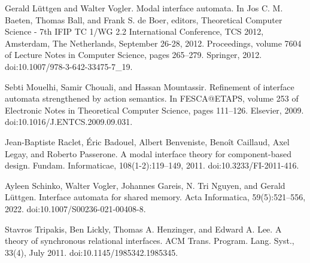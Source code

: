 \documentclass[10pt,a4paper]{article}
\begin{document}
\par\noindent  [21]  Gerald Lüttgen and Walter Vogler.  Modal interface automata.  In Jos C. M. Baeten, Thomas Ball, and Frank S. de Boer, editors, Theoretical Computer Science - 7th IFIP TC 1/WG 2.2 International Conference, TCS 2012, Amsterdam, The Netherlands, September 26-28, 2012. Proceedings, volume 7604 of Lecture Notes in Computer Science, pages 265–279. Springer, 2012.  doi:10.1007/978-3-642-33475-7\_19.  
 
\par\noindent  [22]  Sebti Mouelhi, Samir Chouali, and Hassan Mountassir.  Refinement of interface automata strengthened by action semantics.  In FESCA@ETAPS, volume 253 of Electronic Notes in Theoretical Computer Science, pages 111–126. Elsevier, 2009.  doi:10.1016/J.ENTCS.2009.09.031.  
 
\par\noindent  [23]  Jean-Baptiste Raclet, Éric Badouel, Albert Benveniste, Benoît Caillaud, Axel Legay, and Roberto Passerone.  A modal interface theory for component-based design.  Fundam. Informaticae, 108(1-2):119–149, 2011.  doi:10.3233/FI-2011-416.  
 
\par\noindent  [24]  Ayleen Schinko, Walter Vogler, Johannes Gareis, N. Tri Nguyen, and Gerald Lüttgen.  Interface automata for shared memory.  Acta Informatica, 59(5):521–556, 2022.  doi:10.1007/S00236-021-00408-8.  
 
\par\noindent  [25]  Stavros Tripakis, Ben Lickly, Thomas A. Henzinger, and Edward A. Lee.  A theory of synchronous relational interfaces.  ACM Trans. Program. Lang. Syst., 33(4), July 2011.  doi:10.1145/1985342.1985345.  
  
\end{document}

